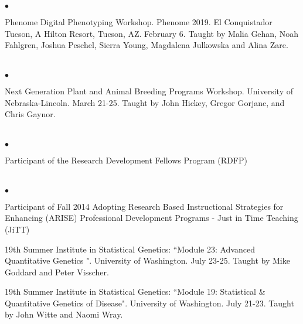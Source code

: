 \documentclass[margin,line,10pt]{res}
\newenvironment{list2}{
  \begin{list}{$\bullet$}{%
      \setlength{\itemsep}{0in}
      \setlength{\parsep}{0in} \setlength{\parskip}{0in}
      \setlength{\topsep}{0in} \setlength{\partopsep}{0in} 
      \setlength{\leftmargin}{0.2in}}}{\end{list}}
\begin{document}
\begin{resume}
\begin{list2}
\item Phenome Digital Phenotyping Workshop. Phenome 2019. El Conquistador Tucson, A Hilton Resort, Tucson, AZ. February 6. Taught by Malia Gehan, Noah Fahlgren, Joshua Peschel, Sierra Young, Magdalena Julkowska and Alina Zare.
\end{list2}  


\section{}
\begin{list2}
\item Next Generation Plant and Animal Breeding Programs Workshop. University of Nebraska-Lincoln. March 21-25.  Taught by John Hickey, Gregor Gorjanc, and Chris Gaynor.
\end{list2}  


\section{}
\begin{list2}
\item Participant of the Research Development Fellows Program (RDFP) 
\end{list2}

\section{}
\begin{list2}

\item Participant of Fall 2014 Adopting Research Based Instructional Strategies for Enhancing (ARISE) Professional Development Programs - Just in Time Teaching (JiTT)

\vspace{0.5cm}

\item 19th Summer Institute in Statistical Genetics: 
``Module 23: Advanced Quantitative Genetics ". University of Washington.  July 23-25.
Taught by Mike Goddard and Peter Visscher. 

\vspace{0.5cm}

\item 19th Summer Institute in Statistical Genetics: 
``Module 19: Statistical \& Quantitative Genetics of Disease". University of Washington. July 21-23.
Taught by John Witte and Naomi Wray. 

\vspace{0.5cm}


\end{list2}
\end{resume}
\end{document}
